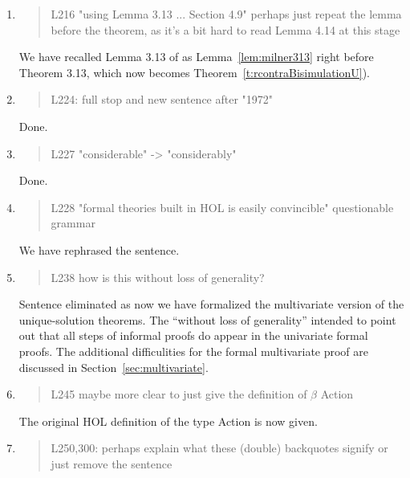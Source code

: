 \begin{enumerate}
\item \begin{quote}
    L216 "using Lemma 3.13 ... Section 4.9" perhaps just repeat the lemma before the theorem, as it's a bit hard to read Lemma 4.14 at this stage 
  \end{quote}

  \Mark
  We have recalled Lemma 3.13 of \cite{Mil89} as
  Lemma~\ref{lem:milner313} right before Theorem 3.13, which now becomes Theorem~\ref{t:rcontraBisimulationU}).

\item \begin{quote}
    L224: full stop and new sentence after "1972"
  \end{quote}
  \Mark
  Done.
  
\item \begin{quote}
    L227 "considerable" -> "considerably"
  \end{quote}
  \Mark
  Done.
  
\item \begin{quote}
    L228 "formal theories built in HOL is easily convincible" questionable grammar
  \end{quote}

  \Mark
We have rephrased the sentence.
\item \begin{quote}
    L238 how is this without loss of generality?
  \end{quote}

  \Mark
  Sentence eliminated as now we have formalized the multivariate
  version of the unique-solution theorems. The ``without loss of
  generality'' intended to point out  that all steps of
  informal proofs do appear in the univariate formal proofs. The
  additional difficulities for the formal multivariate proof are discussed in Section~\ref{sec:multivariate}.
  
\item \begin{quote}
    L245 maybe more clear to just give the definition of $\beta$ Action 
  \end{quote}

  \Mark
  The original HOL definition of the type Action is now given.
  
\item \begin{quote}
    L250,300: perhaps explain what these (double) backquotes signify or just remove the sentence
  \end{quote}


\end{enumerate}
